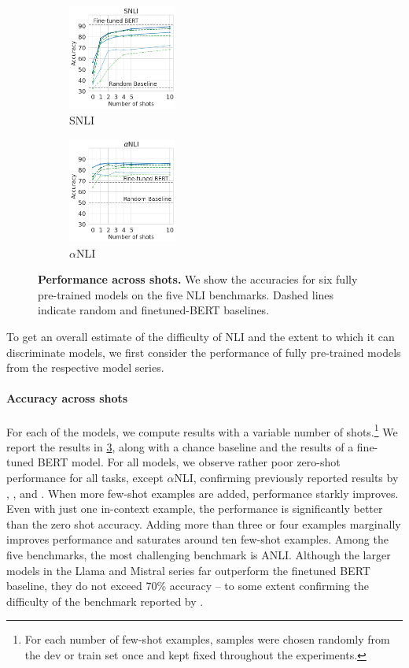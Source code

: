 \begin{figure}[t]
\begin{subfigure}[b]{0.19\textwidth}
    \includegraphics[height=3.45cm, trim=25mm 0 0 0, clip]{figures/snli}
    \caption{SNLI}
    \label{fig:snli}
    \end{subfigure}
    \begin{subfigure}[b]{0.19\textwidth}
    \centering
    \includegraphics[height=3.45cm, trim=25mm 0 0 0, clip]{figures/abductivenli}
    \caption{$\alpha$NLI}
    \label{fig:alphanli}
    \end{subfigure}
    \caption{\textbf{Performance across shots.} We show the accuracies for six fully pre-trained models on the five NLI benchmarks. Dashed lines indicate random and finetuned-BERT baselines.}\label{fig:shot_performance}
\end{figure}

To get an overall estimate of the difficulty of NLI and the extent to which it can discriminate models, we first consider the performance of fully pre-trained models from the respective model series.

\paragraph{Accuracy across shots}
For each of the models, we compute results with a variable number of shots.\footnote{For each number of few-shot examples, samples were chosen randomly from the dev or train set once and kept fixed throughout the experiments.}
We report the results in \cref{fig:shot_performance}, along with a chance baseline and the results of a fine-tuned BERT model.
For all models, we observe rather poor zero-shot performance for all tasks, except $\alpha$NLI, confirming previously reported results by \citet{ohmer2024form}, \citet{weber-etal-2023-mind}, and \citet{dutt-etal-2024-investigating}.
When more few-shot examples are added, performance starkly improves.
Even with just one in-context example, the performance is significantly better than the zero shot accuracy.
Adding more than three or four examples marginally improves performance and saturates around ten few-shot examples. 
Among the five benchmarks, the most challenging benchmark is ANLI.
Although the larger models in the Llama and Mistral series far outperform the finetuned BERT baseline, they do not exceed 70\% accuracy -- to some extent confirming the difficulty of the benchmark reported by \citet{brown2020language}.

